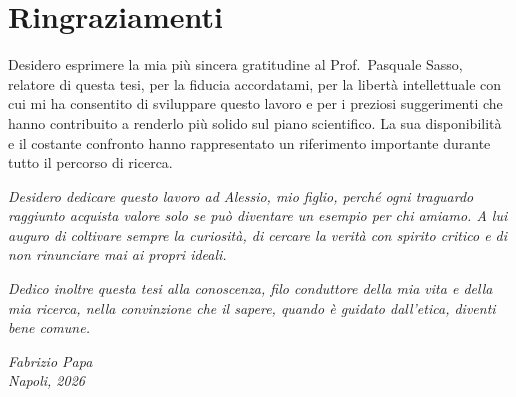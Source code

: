 \chapter*{Ringraziamenti}

\thispagestyle{empty}

\begingroup
\setlength{\parindent}{0pt}

Desidero esprimere la mia più sincera gratitudine al Prof.\ Pasquale Sasso, relatore di questa tesi, per la fiducia accordatami, per la libertà intellettuale con cui mi ha consentito di sviluppare questo lavoro e per i preziosi suggerimenti che hanno contribuito a renderlo più solido sul piano scientifico. La sua disponibilità e il costante confronto hanno rappresentato un riferimento importante durante tutto il percorso di ricerca.

\vspace{1.6\baselineskip}

\textit{Desidero dedicare questo lavoro ad Alessio, mio figlio, perché ogni traguardo raggiunto acquista valore solo se può diventare un esempio per chi amiamo. A lui auguro di coltivare sempre la curiosità, di cercare la verità con spirito critico e di non rinunciare mai ai propri ideali.}

\vspace{1.6\baselineskip}

\textit{Dedico inoltre questa tesi alla conoscenza, filo conduttore della mia vita e della mia ricerca, nella convinzione che il sapere, quando è guidato dall'etica, diventi bene comune.}

\endgroup

\vfill

\begin{flushright}
  \textit{Fabrizio Papa}\\
  \textit{Napoli, 2026}
\end{flushright}
